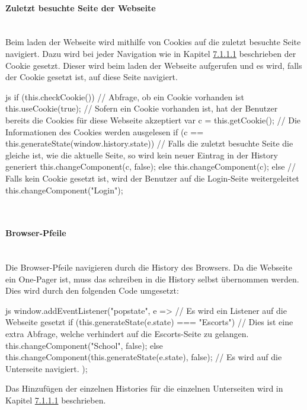 \paragraph{Zuletzt besuchte Seite der Webseite}~\\
Beim laden der Webseite wird mithilfe von Cookies auf die zuletzt besuchte Seite navigiert. Dazu wird bei jeder Navigation wie in Kapitel \hyperref[sec:navigation]{7.1.1.1} beschrieben der Cookie gesetzt. Dieser wird beim laden der Webseite aufgerufen und es wird, falls der Cookie gesetzt ist, auf diese Seite navigiert.
\begin{code}{js}
	if (this.checkCookie()) {		// Abfrage, ob ein Cookie vorhanden ist
		this.useCookie(true);		// Sofern ein Cookie vorhanden ist, hat der Benutzer bereits die Cookies für diese Webseite akzeptiert
		var c = this.getCookie();	// Die Informationen des Cookies werden ausgelesen
		if (c == this.generateState(window.history.state)) {	// Falls die zuletzt besuchte Seite die gleiche ist, wie die aktuelle Seite, so wird kein neuer Eintrag in der History generiert
			this.changeComponent(c, false);
		} else {
			this.changeComponent(c);
		}
	} else {
		// Falls kein Cookie gesetzt ist, wird der Benutzer auf die Login-Seite weitergeleitet
		this.changeComponent("Login");
	}
\end{code}
~\\

\paragraph{Browser-Pfeile}~\\
Die Browser-Pfeile navigieren durch die History des Browsers. Da die Webseite ein One-Pager ist, muss das schreiben in die History selbst übernommen werden. Dies wird durch den folgenden Code umgesetzt:
\begin{code}{js}
window.addEventListener("popstate", e => {			// Es wird ein Listener auf die Webseite gesetzt
	if (this.generateState(e.state) === "Escorts") {	// Dies ist eine  extra Abfrage, welche verhindert auf die Escorts-Seite zu gelangen.
		this.changeComponent("School", false);
	} else {
		this.changeComponent(this.generateState(e.state), false);	// Es wird auf die Unterseite navigiert.
	}
});
\end{code}
Das Hinzufügen der einzelnen Histories für die einzelnen Unterseiten wird in Kapitel \hyperref[sec:navigation]{7.1.1.1} beschrieben.
\newpage
